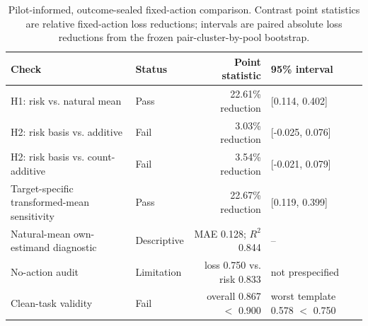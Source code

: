 \begin{table}[H]
\centering
\scriptsize
\begin{tabular}{@{}llrl@{}}
\toprule
Check & Status & Point statistic & 95\% interval \\
\midrule
H1: risk vs. natural mean & Pass & 22.61\% reduction & [0.114, 0.402] \\
H2: risk basis vs. additive & Fail & 3.03\% reduction & [-0.025, 0.076] \\
H2: risk basis vs. count-additive & Fail & 3.54\% reduction & [-0.021, 0.079] \\
Target-specific transformed-mean sensitivity & Pass & 22.67\% reduction & [0.119, 0.399] \\
Natural-mean own-estimand diagnostic & Descriptive & MAE 0.128; $R^2$ 0.844 & -- \\
No-action audit & Limitation & loss 0.750 vs. risk 0.833 & not prespecified \\
Clean-task validity & Fail & overall 0.867 $<$ 0.900 & worst template 0.578 $<$ 0.750 \\
\bottomrule
\end{tabular}
\caption{Pilot-informed, outcome-sealed fixed-action comparison. Contrast point
statistics are relative fixed-action loss reductions; intervals are paired
absolute loss reductions from the frozen pair-cluster-by-pool bootstrap.}
\label{tab:phase6-ioi-confirmation}
\end{table}
